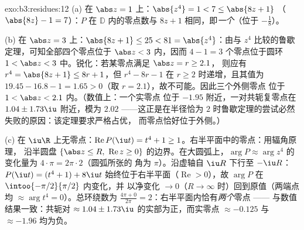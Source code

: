\begin{solution}{exo:b3:residues:12}
(a) 在 $\abs z = 1$ 上：$\abs{z^4} = 1 < 7 \leq \abs{8z + 1}$
（$\abs{8z} - 1 = 7$）：$P$ 在 $\mathbb D$ 内的零点数与
$8z + 1$ 相同，即\emph{一个}（位于 $-\frac18$）。

(b) 在 $\abs z = 3$ 上：$\abs{8z + 1} \leq 25 < 81 =
\abs{z^4}$：由与 $z^4$ 比较的鲁歇定理，可知全部四个零点位于
$\abs z < 3$ 内，因而 $4 - 1 = 3$ 个零点位于圆环 $1 <
\abs z < 3$ 中。锐化：若某零点满足 $\abs z = r \geq 2.1$，
则应有 $r^4 = \abs{8z + 1} \leq 8r + 1$，但 $r^4 -
8r - 1$ 在 $r \geq 2$ 时递增，且其值为 $19.45 -
16.8 - 1 = 1.65 > 0$（取 $r = 2.1$），故不可能。因此三个外侧零点
位于 $1 < \abs z < 2.1$ 内。（数值上：一个实零点
位于 $-1.95$ 附近，一对共轭复零点在 $1.04 \pm
1.73\iu$ 附近，模为 $2.02$ ——这正是在半径恰为
$2$ 时鲁歇定理的尝试必然失败的原因：该定理要求严格占优，
而零点恰好位于外侧。）

(c) 在 $\iu\R$ 上无零点：$\operatorname{Re}P(\iu t) = t^4 +
1 \geq 1$。右半平面中的零点：用辐角原理，
沿半圆盘 $\{\abs z \leq
R,\ \operatorname{Re}z \geq 0\}$ 的边界。在大圆弧上，$\arg P
\approx \arg z^4$ 的变化量为 $4\cdot\pi = 2\pi\cdot2$（圆弧所张的
角为 $\pi$）。沿虚轴自
$\iu R$ 下行至 $-\iu R$：$P(\iu t) = (t^4 + 1) + 8\iu t$
始终位于右半平面（$\operatorname{Re} > 0$），故
$\arg P$ 在 $\intoo{-\pi/2}{\pi/2}$ 内变化，并
以净变化 $\to 0$（$R \to \infty$ 时）回到原值（两端点均
$\approx \arg t^4 = 0$）。总环绕数为 $\frac{4\pi + 0}
{2\pi} = 2$：右半平面内恰有\emph{两个}零点 ——
与数值结果一致：共轭对 $\approx
1.04 \pm 1.73\iu$ 的实部为正，而实零点
$\approx -0.125$ 与 $\approx -1.96$ 均为负。
\end{solution}

